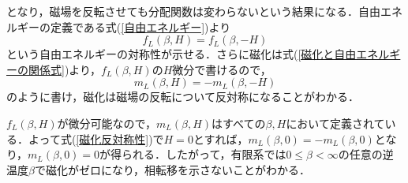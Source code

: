 \documentclass[a4paper,11pt]{jsreport}
\begin{document}
となり，磁場を反転させても分配関数は変わらないという結果になる．自由エネルギーの定義である式(\ref{自由エネルギー})より
\begin{equation}
  f_L(\beta, H) = f_L(\beta, -H)
\end{equation}
という自由エネルギーの対称性が示せる．さらに磁化は式(\ref{磁化と自由エネルギーの関係式})より，$f_L(\beta, H)$の$H$微分で書けるので，
\begin{equation}
  m_L(\beta, H) = -m_L(\beta, -H) \label{磁化反対称性}
\end{equation}
のように書け，磁化は磁場の反転について反対称になることがわかる．\par
$f_L(\beta, H)$が微分可能なので，$m_L(\beta, H)$はすべての$\beta, H$において定義されている．よって式(\ref{磁化反対称性})で$H=0$とすれば，$m_L(\beta, 0) = -m_L(\beta, 0)$となり，$m_L(\beta, 0)=0$が得られる．したがって，有限系では$0\leq \beta < \infty$の任意の逆温度$\beta$で磁化がゼロになり，相転移を示さないことがわかる．
\end{document}
